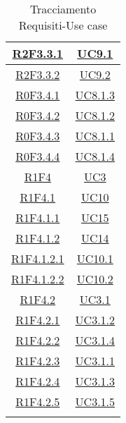 \begin{longtable}{|c|c|}
\hline
\hyperlink{R2F3.3.1}{R2F3.3.1} & \hyperlink{UC9.1}{UC9.1}\\
\hline
\hyperlink{R2F3.3.2}{R2F3.3.2} & \hyperlink{UC9.2}{UC9.2}\\
\hline
\hyperlink{R0F3.4.1}{R0F3.4.1} & \hyperlink{UC8.1.3}{UC8.1.3}\\
\hline
\hyperlink{R0F3.4.2}{R0F3.4.2} & \hyperlink{UC8.1.2}{UC8.1.2}\\
\hline
\hyperlink{R0F3.4.3}{R0F3.4.3} & \hyperlink{UC8.1.1}{UC8.1.1}\\
\hline
\hyperlink{R0F3.4.4}{R0F3.4.4} & \hyperlink{UC8.1.4}{UC8.1.4}\\
\hline
\hyperlink{R1F4}{R1F4} & \hyperlink{UC3}{UC3}\\
\hline
\hyperlink{R1F4.1}{R1F4.1} & \hyperlink{UC10}{UC10}\\
\hline
\hyperlink{R1F4.1.1}{R1F4.1.1} & \hyperlink{UC15}{UC15}\\
\hline
\hyperlink{R1F4.1.2}{R1F4.1.2} & \hyperlink{UC14}{UC14}\\
\hline
\hyperlink{R1F4.1.2.1}{R1F4.1.2.1} & \hyperlink{UC10.1}{UC10.1}\\
\hline
\hyperlink{R1F4.1.2.2}{R1F4.1.2.2} & \hyperlink{UC10.2}{UC10.2}\\
\hline
\hyperlink{R1F4.2}{R1F4.2} & \hyperlink{UC3.1}{UC3.1}\\
\hline
\hyperlink{R1F4.2.1}{R1F4.2.1} & \hyperlink{UC3.1.2}{UC3.1.2}\\
\hline
\hyperlink{R1F4.2.2}{R1F4.2.2} & \hyperlink{UC3.1.4}{UC3.1.4}\\
\hline
\hyperlink{R1F4.2.3}{R1F4.2.3} & \hyperlink{UC3.1.1}{UC3.1.1}\\
\hline
\hyperlink{R1F4.2.4}{R1F4.2.4} & \hyperlink{UC3.1.3}{UC3.1.3}\\
\hline
\hyperlink{R1F4.2.5}{R1F4.2.5} & \hyperlink{UC3.1.5}{UC3.1.5}\\
\hline
\caption[Tracciamento Requisiti-Use case]{Tracciamento Requisiti-Use case}
\label{tabella:requi-usecase}
\end{longtable}
\clearpage
\normalsize
